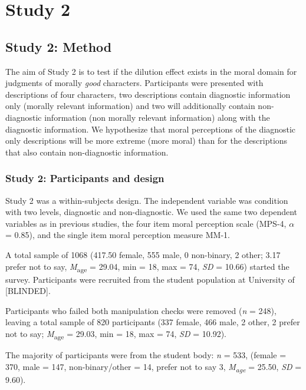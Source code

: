 \documentclass[
  english,
  man,floatsintext]{apa7}
\begin{document}
\hypertarget{study-2}{%
\section{Study 2}\label{study-2}}

\hypertarget{study-2-method}{%
\subsection{Study 2: Method}\label{study-2-method}}

The aim of Study 2 is to test if the dilution effect exists in the moral domain for judgments of morally \emph{good} characters. Participants were presented with descriptions of four characters, two descriptions contain diagnostic information only (morally relevant information) and two will additionally contain non-diagnostic information (non morally relevant information) along with the diagnostic information. We hypothesize that moral perceptions of the diagnostic only descriptions will be more extreme (more moral) than for the descriptions that also contain non-diagnostic information.

\hypertarget{study-2-participants-and-design}{%
\subsubsection{Study 2: Participants and design}\label{study-2-participants-and-design}}

Study 2 was a within-subjects design. The independent variable was condition with two levels, diagnostic and non-diagnostic. We used the same two dependent variables as in previous studies, the four item moral perception scale (MPS-4, \(\alpha\) = 0.85), and the single item moral perception measure MM-1.

A total sample of 1068 (417.50 female, 555 male, 0 non-binary, 2 other; 3.17 prefer not to say, \emph{M}\textsubscript{age} = 29.04, min = 18, max = 74, \emph{SD} = 10.66) started the survey. Participants were recruited from the student population at University of {[}BLINDED{]}.

Participants who failed both manipulation checks were removed (\emph{n} = 248), leaving a total sample of 820 participants (337 female, 466 male, 2 other, 2 prefer not to say; \emph{M}\textsubscript{age} = 29.03, min = 18, max = 74, \emph{SD} = 10.92).

The majority of participants were from the student body: \emph{n} = 533, (female = 370, male = 147, non-binary/other = 14, prefer not to say 3, \emph{M\textsubscript{age}} = 25.50, \emph{SD} = 9.60).
\end{document}
